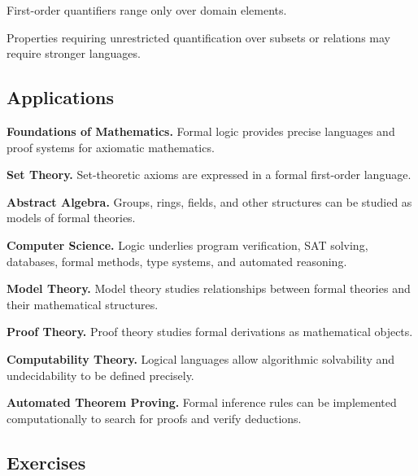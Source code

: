 First-order quantifiers range only over domain elements.

Properties requiring unrestricted quantification over subsets or relations
may require stronger languages.

\subsection{Applications}
\label{subsec:formal-logic-applications}

\begin{applicationbox}

\textbf{Foundations of Mathematics.}
Formal logic provides precise languages and proof systems for axiomatic
mathematics.

\medskip

\textbf{Set Theory.}
Set-theoretic axioms are expressed in a formal first-order language.

\medskip

\textbf{Abstract Algebra.}
Groups, rings, fields, and other structures can be studied as models of
formal theories.

\medskip

\textbf{Computer Science.}
Logic underlies program verification, SAT solving, databases, formal
methods, type systems, and automated reasoning.

\medskip

\textbf{Model Theory.}
Model theory studies relationships between formal theories and their
mathematical structures.

\medskip

\textbf{Proof Theory.}
Proof theory studies formal derivations as mathematical objects.

\medskip

\textbf{Computability Theory.}
Logical languages allow algorithmic solvability and undecidability to be
defined precisely.

\medskip

\textbf{Automated Theorem Proving.}
Formal inference rules can be implemented computationally to search for
proofs and verify deductions.

\end{applicationbox}

\subsection{Exercises}
\label{subsec:formal-logic-exercises}

